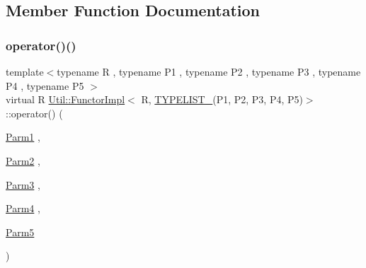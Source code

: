 \subsection{Member Function Documentation}
\mbox{\label{classUtil_1_1FunctorImpl_3_01R_00_01TYPELIST__5_07P1_00_01P2_00_01P3_00_01P4_00_01P5_08_4_afa0289015b075748033bab4939b8ecbb}} 
\subsubsection{\texorpdfstring{operator()()}{operator()()}\hspace{0.1cm}{\footnotesize\ttfamily [1/3]}}
{\footnotesize\ttfamily template$<$typename R , typename P1 , typename P2 , typename P3 , typename P4 , typename P5 $>$ \\
virtual R \mbox{\hyperlink{classUtil_1_1FunctorImpl}{Util\+::\+Functor\+Impl}}$<$ R, \mbox{\hyperlink{adat__devel__install_2include_2adat_2typelist_8h_aad5d9b3c82c8503c85c625acd41c0a2f}{T\+Y\+P\+E\+L\+I\+S\+T\+\_}}(P1, P2, P3, P4, P5)$>$\+::operator() (\begin{DoxyParamCaption}\item[{\mbox{\hyperlink{structUtil_1_1Private_1_1FunctorImplBase_a9d61e693d6c616dea5bd9d9073c7d21a}{Parm1}}}]{,  }\item[{\mbox{\hyperlink{structUtil_1_1Private_1_1FunctorImplBase_a554085cd798ef14838a59b528f0feb2e}{Parm2}}}]{,  }\item[{\mbox{\hyperlink{structUtil_1_1Private_1_1FunctorImplBase_a052148e627fd4caecbcffdbdf1033dbb}{Parm3}}}]{,  }\item[{\mbox{\hyperlink{structUtil_1_1Private_1_1FunctorImplBase_a1ad7fe3f243480c44a610927ebe76762}{Parm4}}}]{,  }\item[{\mbox{\hyperlink{structUtil_1_1Private_1_1FunctorImplBase_ac5b1d132e854e4f9fd6fb1e43313fa26}{Parm5}}}]{ }\end{DoxyParamCaption})\hspace{0.3cm}{\ttfamily [pure virtual]}}

\mbox{\label{classUtil_1_1FunctorImpl_3_01R_00_01TYPELIST__5_07P1_00_01P2_00_01P3_00_01P4_00_01P5_08_4_afa0289015b075748033bab4939b8ecbb}} 
